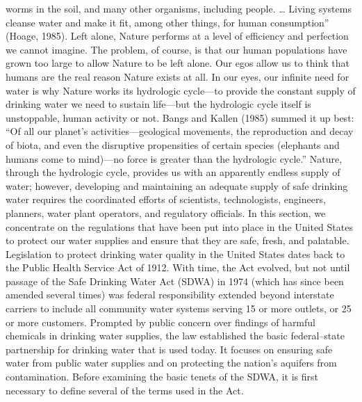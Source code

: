 \documentclass{article}
\begin{document}
worms in the soil, and many other organisms, including people. \ldots{}
Living systems cleanse water and make it fit, among other things, for
human consumption'' (Hoage, 1985). Left alone, Nature performs at a
level of efficiency and perfection we cannot imagine. The problem, of
course, is that our human populations have grown too large to allow
Nature to be left alone. Our egos allow us to think that humans are the
real reason Nature exists at all. In our eyes, our infinite need for
water is why Nature works its hydrologic cycle---to provide the constant
supply of drinking water we need to sustain life---but the hydrologic
cycle itself is unstoppable, human activity or not. Bangs and Kallen
(1985) summed it up best: ``Of all our planet's activities---geological
movements, the reproduction and decay of biota, and even the disruptive
propensities of certain species (elephants and humans come to mind)---no
force is greater than the hydrologic cycle.'' Nature, through the
hydrologic cycle, provides us with an apparently endless supply of
water; however, developing and maintaining an adequate supply of safe
drinking water requires the coordinated efforts of scientists,
technologists, engineers, planners, water plant operators, and
regulatory officials. In this section, we concentrate on the regulations
that have been put into place in the United States to protect our water
supplies and ensure that they are safe, fresh, and palatable.
Legislation to protect drinking water quality in the United States dates
back to the Public Health Service Act of 1912. With time, the Act
evolved, but not until passage of the Safe Drinking Water Act (SDWA) in
1974 (which has since been amended several times) was federal
responsibility extended beyond interstate carriers to include all
community water systems serving 15 or more outlets, or 25 or more
customers. Prompted by public concern over findings of harmful chemicals
in drinking water supplies, the law established the basic federal--state
partnership for drinking water that is used today. It focuses on
ensuring safe water from public water supplies and on protecting the
nation's aquifers from contamination. Before examining the basic tenets
of the SDWA, it is first necessary to define several of the terms used
in the Act.
\end{document}
